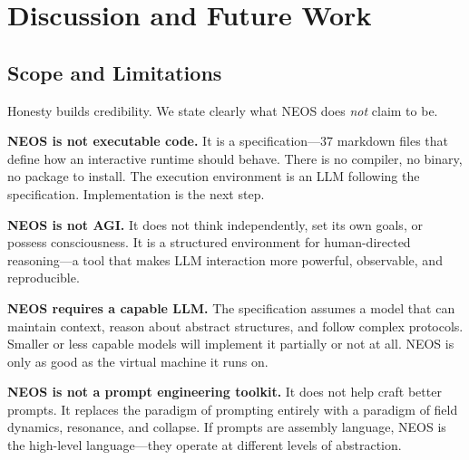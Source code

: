 \section{Discussion and Future Work}\label{sec:discussion}

\subsection{Scope and Limitations}\label{sec:scope}

Honesty builds credibility. We state clearly what NEOS does \emph{not} claim to be.

\textbf{NEOS is not executable code.} It is a specification---37 markdown files that define how an interactive runtime should behave. There is no compiler, no binary, no package to install. The execution environment is an LLM following the specification. Implementation is the next step.

\textbf{NEOS is not AGI.} It does not think independently, set its own goals, or possess consciousness. It is a structured environment for human-directed reasoning---a tool that makes LLM interaction more powerful, observable, and reproducible.

\textbf{NEOS requires a capable LLM.} The specification assumes a model that can maintain context, reason about abstract structures, and follow complex protocols. Smaller or less capable models will implement it partially or not at all. NEOS is only as good as the virtual machine it runs on.

\textbf{NEOS is not a prompt engineering toolkit.} It does not help craft better prompts. It replaces the paradigm of prompting entirely with a paradigm of field dynamics, resonance, and collapse. If prompts are assembly language, NEOS is the high-level language---they operate at different levels of abstraction.

